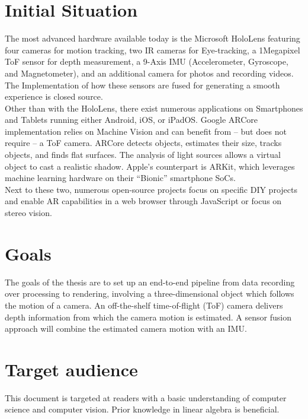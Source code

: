 \section{Initial Situation}
\label{sec:Situation}
The most advanced hardware available today is the Microsoft HoloLens featuring four cameras for motion tracking, two IR cameras for Eye-tracking, a 1Megapixel ToF sensor for depth measurement, a 9-Axis IMU (Accelerometer, Gyroscope, and Magnetometer), and an additional camera for photos and recording videos. The Implementation of how these sensors are fused for generating a smooth experience is closed source.\\
Other than with the HoloLens, there exist numerous applications on Smartphones and Tablets running either Android, iOS, or iPadOS. Google ARCore implementation relies on Machine Vision and can benefit from – but does not require –  a ToF camera. ARCore detects objects, estimates their size, tracks objects, and finds flat surfaces. The analysis of light sources allows a virtual object to cast a realistic shadow. Apple’s counterpart is ARKit, which leverages machine learning hardware on their “Bionic” smartphone SoCs.\\
Next to these two, numerous open-source projects focus on specific DIY projects and enable AR capabilities in a web browser through JavaScript or focus on stereo vision. 
\section{Goals}
\label{sec:Goals}
The goals of the thesis are to set up an end-to-end pipeline from data recording over processing to rendering, involving a three-dimensional object which follows the motion of a camera. An off-the-shelf time-of-flight (ToF) camera delivers depth information from which the camera motion is estimated. A sensor fusion approach will combine the estimated camera motion with an IMU.
\section{Target audience}
\label{sec:Ziel}
This document is targeted at readers with a basic understanding of computer science and computer vision. Prior knowledge in linear algebra is beneficial.